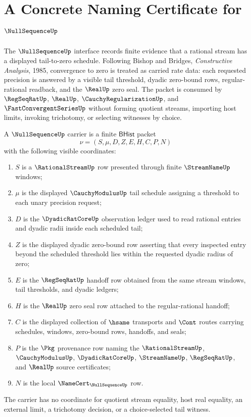 \chapter{A Concrete Naming Certificate for $\NullSequenceUp$}
\label{ch:concrete-instances-nullsequence-namecert}

The $\NullSequenceUp$ interface records finite evidence that a rational stream has a displayed tail-to-zero schedule. Following Bishop and Bridges, \emph{Constructive Analysis}, 1985, convergence to zero is treated as carried rate data: each requested precision is answered by a visible tail threshold, dyadic zero-bound rows, regular-rational readback, and the $\RealUp$ zero seal. The packet is consumed by $\RegSeqRatUp$, $\RealUp$, $\CauchyRegularizationUp$, and $\FastConvergentSeriesUp$ without forming quotient streams, importing host limits, invoking trichotomy, or selecting witnesses by choice.

\begin{definition}
\label{def:nullsequence-carrier}
A $\NullSequenceUp$ carrier is a finite $\mathsf{BHist}$ packet
$$
\nu=(S,\mu,D,Z,E,H,C,P,N)
$$
with the following visible coordinates:
\begin{enumerate}
\item $S$ is a $\RationalStreamUp$ row presented through finite $\StreamNameUp$ windows;
\item $\mu$ is the displayed $\CauchyModulusUp$ tail schedule assigning a threshold to each unary precision request;
\item $D$ is the $\DyadicRatCoreUp$ observation ledger used to read rational entries and dyadic radii inside each scheduled tail;
\item $Z$ is the displayed dyadic zero-bound row asserting that every inspected entry beyond the scheduled threshold lies within the requested dyadic radius of zero;
\item $E$ is the $\RegSeqRatUp$ handoff row obtained from the same stream windows, tail thresholds, and dyadic ledgers;
\item $H$ is the $\RealUp$ zero seal row attached to the regular-rational handoff;
\item $C$ is the displayed collection of $\hsame$ transports and $\Cont$ routes carrying schedules, windows, zero-bound rows, handoffs, and seals;
\item $P$ is the $\Pkg$ provenance row naming the $\RationalStreamUp$, $\CauchyModulusUp$, $\DyadicRatCoreUp$, $\StreamNameUp$, $\RegSeqRatUp$, and $\RealUp$ source certificates;
\item $N$ is the local $\NameCert_{\NullSequenceUp}$ row.
\end{enumerate}
The carrier has no coordinate for quotient stream equality, host real equality, an external limit, a trichotomy decision, or a choice-selected tail witness.
\end{definition}


